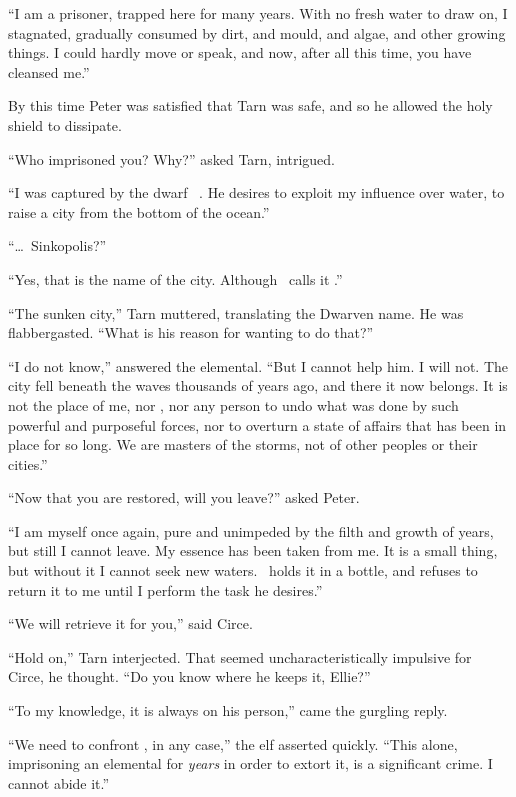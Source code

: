 ``I am a prisoner, trapped here for many years.  With no fresh water to draw on, I stagnated, gradually consumed by dirt, and mould, and algae, and other growing things.  I could hardly move or speak, and now, after all this time, you have cleansed me.''

By this time Peter was satisfied that Tarn was safe, and so he allowed the holy shield to dissipate.

``Who imprisoned you?  Why?''  asked Tarn, intrigued.

``I was captured by the dwarf \mothzam\ \driktur.  He desires to exploit my influence over water, to raise a city from the bottom of the ocean.''

``\ldots\ Sinkopolis?''

``Yes, that is the name of the city.  Although \mothzam\ calls it \valdunmir.''

``The sunken city,'' Tarn muttered, translating the Dwarven name.  He was flabbergasted. ``What is his reason for wanting to do that?''

``I do not know,'' answered the elemental.  ``But I cannot help him.  I will not.  The city fell beneath the waves thousands of years ago, and there it now belongs.  It is not the place of me, nor \mothzam, nor any person to undo what was done by such powerful and purposeful forces, nor to overturn a state of affairs that has been in place for so long.  We are masters of the storms, not of other peoples or their cities.''

``Now that you are restored, will you leave?'' asked Peter.

``I am myself once again, pure and unimpeded by the filth and growth of years, but still I cannot leave.  My essence has been taken from me.  It is a small thing, but without it I cannot seek new waters.  \mothzam\ holds it in a bottle, and refuses to return it to me until I perform the task he desires.''

``We will retrieve it for you,'' said Circe.

``Hold on,'' Tarn interjected.  That seemed uncharacteristically impulsive for Circe, he thought.  ``Do you know where he keeps it, Ellie?''

``To my knowledge, it is always on his person,'' came the gurgling reply.

``We need to confront \mothzam, in any case,'' the elf asserted quickly.  ``This alone, imprisoning an elemental for \emph{years} in order to extort it, is a significant crime.  I cannot abide it.''


